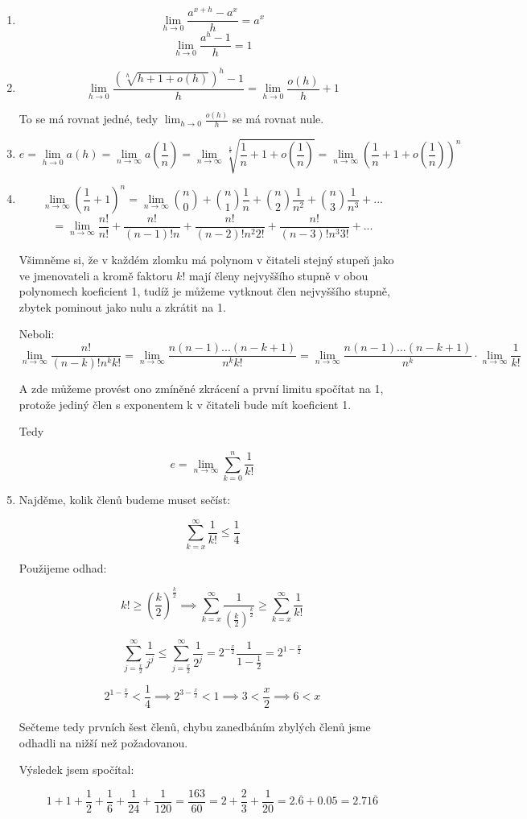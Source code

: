 \documentclass[10pt,a4paper]{article}
\theoremstyle{plain}
\theoremstyle{definition}
\begin{document}
\begin{enumerate}
\item \[\lim_{h \to 0} \frac{a^{x+h} - a^x}h = a^x \]
\[\lim_{h \to 0} \frac{a^{h} - 1}h = 1 \]
\item \[\lim_{h \to 0} \frac{(\sqrt[h]{h+1+o(h)})^{h}  - 1 }h  =\lim_{h \to 0} \frac{o(h)}h + 1 \]

To se má rovnat jedné, tedy $\lim_{h \to 0} \frac{o(h)}h$ se má rovnat nule.

\item \[ e= \lim_{h \to 0} a(h) = \lim_{n \to \infty} a(\frac1{n}) = \lim_{n \to \infty} \sqrt[\frac1n]{\frac1n+1+o\left(\frac1n\right)} 
= \lim_{n \to \infty} \left(\frac1n+1+o\left(\frac1n\right)\right)^n \]

\item \[  \lim_{n \to \infty} \left(\frac1n+1\right)^n 
= \lim_{n \to \infty} \binom{n}{0} + \binom{n}{1}\frac1n 
+   \binom{n}{2}\frac1{n^2}  +  \binom{n}{3}\frac1{n^3}   + ... 
\]\[
= \lim_{n \to \infty} \frac{n!}{n!} + \frac{n!}{(n-1)!n} 
+   \frac{n!}{(n-2)!n^2 2!} +  \frac{n!}{(n-3)!n^3 3!}  + ...\]

Všimněme si, že v každém zlomku má polynom v čitateli stejný stupeň jako ve jmenovateli a kromě faktoru $k!$ mají členy nejvyššího stupně v obou polynomech koeficient 1, tudíž je můžeme vytknout člen nejvyššího stupně, zbytek pominout jako nulu a zkrátit na 1.

Neboli: \[
\lim_{n \to \infty} \frac{n!}{(n-k)!n^k k!} 
= \lim_{n \to \infty} \frac{n(n-1) ... (n-k+1)}{n^k k!}
= \lim_{n \to \infty} \frac{n(n-1) ... (n-k+1)}{n^k} \cdot   \lim_{n \to \infty} \frac1{k!} \]

A zde můžeme provést ono zmíněné zkrácení a první limitu spočítat na 1, protože jediný člen s exponentem k v čitateli bude mít koeficient 1.

Tedy

\[ e = \lim_{n \to \infty} \sum^n_{k=0} \frac1{k!}\]

\item

Najděme, kolik členů budeme muset sečíst:

\[ \sum^\infty_{k=x} \frac1{k!} \leq \frac14\]

Použijeme odhad:

\[ k! \geq \left(\frac{k}2\right)^\frac{k}{2} \implies \sum^\infty_{k=x} \frac1{\left(\frac{k}2\right)^\frac{k}{2}} \geq \sum^\infty_{k=x} \frac1{k!} \]

\[ \sum^\infty_{j=\frac{x}2} \frac1{j^j} \leq 
\sum^\infty_{j=\frac{x}2} \frac1{2^j}= 2^{-\frac{x}2}\frac{1}{1-\frac12} = 2^{1-\frac{x}2} \]

\[ 2^{1-\frac{x}2} < \frac14 \implies 2^{3-\frac{x}2} < 1 \implies 3 < \frac{x}2 \implies 6 < x  \]

Sečteme tedy prvních šest členů, chybu zanedbáním zbylých členů jsme odhadli na nižší než požadovanou.

Výsledek jsem spočítal: 

\[ 1 + 1 + \frac12 + \frac16 + \frac1{24} + \frac1{120} = \frac{163}{60} = 2 + \frac23 + \frac1{20} = 2.\overline{6} + 0.05 =   2.71\overline{6} \]


\end{enumerate}
\end{document}
